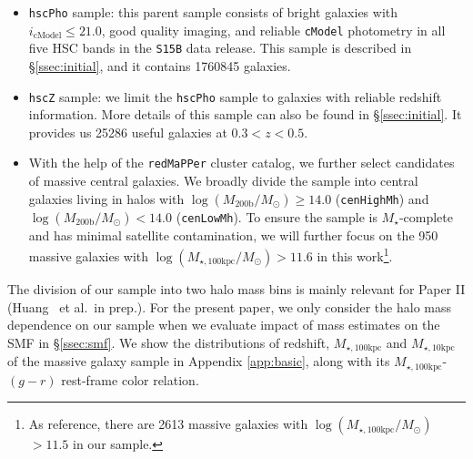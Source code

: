 \documentclass[a4paper,fleqn,usenatbib]{mnras}
\def\etal{{\ et al.~}}
\def\redm{\texttt{redMaPPer}}
\def\rbcg{\texttt{cenHighMh}}
\def\nbcg{\texttt{cenLowMh}}
\def\mstar{{$M_{\star}$}}
\def\logmh{{$\log (M_{\mathrm{200b}}/M_{\odot})$}}
\def\minn{{$M_{\star,10\mathrm{kpc}}$}}
\def\mtot{{$M_{\star,100\mathrm{kpc}}$}}
\def\logmtot{{$\log (M_{\star,100\mathrm{kpc}}/M_{\odot})$}}
\begin{document}
    \begin{itemize}
        \item \texttt{hscPho} sample: this parent sample consists of bright galaxies 
            with $i_{\mathrm{cModel}} \leq 21.0$, good quality imaging, and reliable 
            \texttt{cModel} photometry in all five HSC bands in the \texttt{S15B} 
            data release. 
            This sample is described in \S \ref{ssec:initial}, and it contains 
            1760845 galaxies. 
        \item \texttt{hscZ} sample: we limit the \texttt{hscPho} sample to galaxies 
            with reliable redshift information. 
            More details of this sample can also be found in \S \ref{ssec:initial}. 
            It provides us 25286 useful galaxies at $0.3<z<0.5$.
        \item With the help of the \redm{} cluster catalog, we further select 
            candidates of massive central galaxies.
            We broadly divide the sample into central galaxies living in halos
            with \logmh{}$\geq 14.0$ (\rbcg{}) and \logmh{}$<14.0$ (\nbcg{}).
            To ensure the sample is \mstar{}-complete and has minimal satellite 
            contamination, we will further focus on the 950 massive galaxies with 
            \logmtot{}$>11.6$ in this work\footnote{As reference, there are 
            2613 massive galaxies with \logmtot{}$>11.5$ in our sample.}. 
           
    \end{itemize}
    
    The division of our sample into two halo mass bins is mainly relevant for Paper II
    (Huang \etal in prep.).  
    For the present paper, we only consider the halo mass dependence on our sample when 
    we evaluate impact of mass estimates on the SMF in \S \ref{ssec:smf}. 
    We show the distributions of redshift, \mtot{} and \minn{} of the massive galaxy 
    sample in Appendix \ref{app:basic}, along with its \mtot{}-$(g-r)$ rest-frame 
    color relation.

\end{document}
